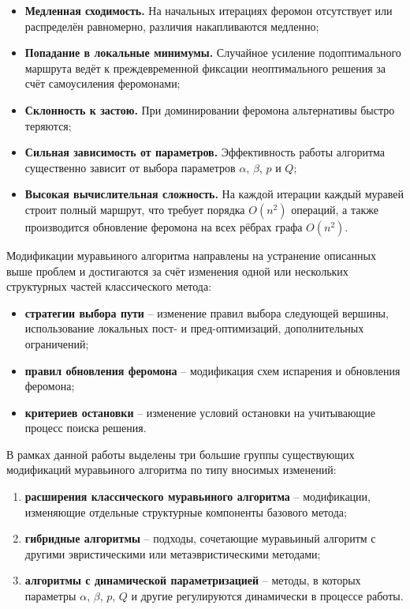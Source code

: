 \begin{itemize}
	\item \textbf{Медленная сходимость.} На начальных итерациях феромон отсутствует или распределён равномерно, различия накапливаются медленно;
	\item \textbf{Попадание в локальные минимумы.} Случайное усиление подоптимального маршрута ведёт к преждевременной фиксации неоптимального решения за счёт самоусиления феромонами;
	\item \textbf{Склонность к застою.} При доминировании феромона альтернативы быстро теряются;
	
	\item \textbf{Сильная зависимость от параметров.} Эффективность работы алгоритма существенно зависит от выбора параметров $\alpha$, $\beta$, $p$ и $Q$;
	
	\item \textbf{Высокая вычислительная сложность.} На каждой итерации каждый муравей строит полный маршрут, что требует порядка $O(n^2)$ операций, а также производится обновление феромона на всех рёбрах графа $O(n^2)$.
\end{itemize}

Модификации муравьиного алгоритма направлены на устранение описанных выше проблем и достигаются за счёт изменения одной или нескольких структурных частей классического метода:

\begin{itemize}
	\item \textbf{стратегии выбора пути} -- изменение правил выбора следующей вершины, использование локальных пост- и пред-оптимизаций, дополнительных ограничений;
	
	\item \textbf{правил обновления феромона} -- модификация схем испарения и обновления феромона;
	
	\item \textbf{критериев остановки} -- изменение условий остановки на учитывающие процесс поиска решения.
\end{itemize}


В рамках данной работы выделены три большие группы существующих модификаций муравьиного алгоритма по типу вносимых изменений:

\begin{enumerate}
	\item \textbf{расширения классического муравьиного алгоритма} -- модификации, изменяющие отдельные структурные компоненты базового метода;
	
	\item \textbf{гибридные алгоритмы} -- подходы, сочетающие муравьиный алгоритм с другими эвристическими или метаэвристическими методами;
	
	\item \textbf{алгоритмы с динамической параметризацией} -- методы, в которых параметры $\alpha$, $\beta$, $p$, $Q$ и другие регулируются динамически в процессе работы.
\end{enumerate}

